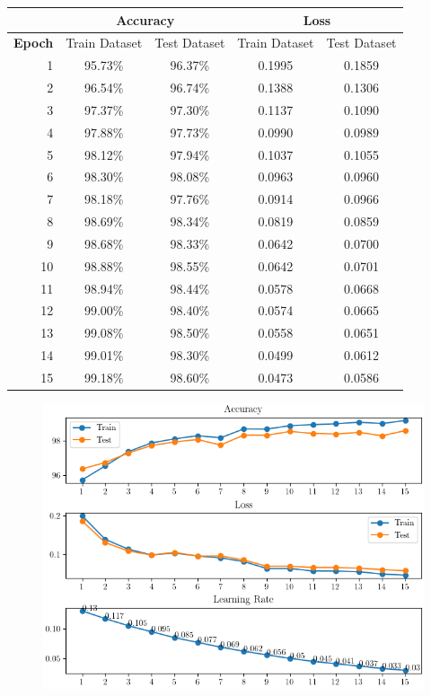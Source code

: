 \documentclass[10pt,a4paper,fullpage]{article}
\begin{document}
\vspace{-0.5cm}
\begin{center}
	\begin{tabular}{ r | c | c | c | c }
		\hline
		\multicolumn{1}{c|}{} & \multicolumn{2}{c|}{\textbf{Accuracy}} & \multicolumn{2}{c}{\textbf{Loss}}\\
		\hline
		\textbf{Epoch} & Train Dataset & Test Dataset & Train Dataset & Test Dataset\\
		\hline
		1 & 95.73\% & 96.37\% & 0.1995 & 0.1859 \\
		2 & 96.54\% & 96.74\% & 0.1388 & 0.1306 \\
		3 & 97.37\% & 97.30\% & 0.1137 & 0.1090 \\
		4 & 97.88\% & 97.73\% & 0.0990 & 0.0989 \\
		5 & 98.12\% & 97.94\% & 0.1037 & 0.1055 \\
		6 & 98.30\% & 98.08\% & 0.0963 & 0.0960 \\
		7 & 98.18\% & 97.76\% & 0.0914 & 0.0966 \\
		8 & 98.69\% & 98.34\% & 0.0819 & 0.0859 \\
		9 & 98.68\% & 98.33\% & 0.0642 & 0.0700 \\
		10 & 98.88\% & 98.55\% & 0.0642 & 0.0701 \\
		11 & 98.94\% & 98.44\% & 0.0578 & 0.0668 \\
		12 & 99.00\% & 98.40\% & 0.0574 & 0.0665 \\
		13 & 99.08\% & 98.50\% & 0.0558 & 0.0651 \\
		14 & 99.01\% & 98.30\% & 0.0499 & 0.0612 \\
		15 & 99.18\% & 98.60\% & 0.0473 & 0.0586 \\
		\hline
	\end{tabular}
\end{center}

\begin{figure}
	\begin{center}
%		
		\includegraphics[scale=1]{cnn_model_plot.png}
	\end{center}
\end{figure}
\end{document}
